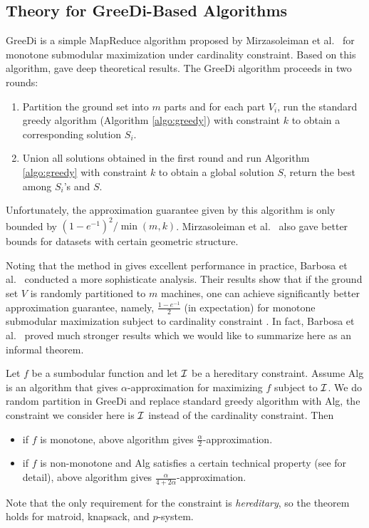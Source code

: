 \subsection{Theory for {\sc GreeDi}-Based Algorithms}
{\sc GreeDi} is a simple MapReduce algorithm proposed by  Mirzasoleiman et al.\ \cite{MKS+13} for monotone submodular maximization under cardinality constraint. Based on this algorithm, \cite{DEN+15,MZ15} gave deep theoretical results. The {\sc GreeDi} algorithm proceeds in two rounds:
\begin{enumerate}
\item Partition the ground set into $m$ parts and for each part $V_i$, run the standard greedy algorithm (Algorithm \ref{algo:greedy}) with constraint $k$ to obtain a corresponding solution $S_i$.
\item Union all solutions obtained in the first round and run Algorithm \ref{algo:greedy} with constraint $k$ to obtain a global solution $S$, return the best among $S_i$'s and $S$.
\end{enumerate}

Unfortunately, the approximation guarantee given by this algorithm is only bounded by $(1 - e^{-1})^2/\min(m, k)$. Mirzasoleiman et al.\ \cite{MKS+13} also gave better bounds for datasets with certain geometric structure.

Noting that the method in \cite{MKS+13} gives excellent performance in practice, Barbosa et al.\ \cite{DEN+15} conducted a more sophisticate analysis. Their results show that if the ground set $V$ is randomly partitioned to $m$ machines, one can achieve significantly better approximation guarantee, namely, $\frac{1 - e^{-1}}{2}$ (in expectation) for monotone submodular maximization subject to cardinality constraint . In fact, Barbosa et al.\ \cite{DEN+15} proved much stronger results which we would like to summarize here as an informal theorem.
\begin{theorem}
  \label{thm:randomGreeDi}
  Let $f$ be a sumbodular function and let $\mathcal{I}$ be a hereditary constraint. Assume {\sc Alg} is an algorithm that gives $\alpha$-approximation for maximizing $f$ subject to $\mathcal{I}$. We do random partition in {\sc GreeDi} and replace standard greedy algorithm with {\sc Alg}, the constraint we consider here is $\mathcal{I}$ instead of the cardinality constraint. Then 
  \begin{itemize}
  \item if $f$ is monotone, above algorithm gives $\frac{\alpha}{2}$-approximation.
  \item if $f$ is non-monotone and {\sc Alg} satisfies a certain technical property (see \cite{DEN+15} for detail), above algorithm gives $\frac{\alpha}{4 + 2\alpha}$-approximation.
  \end{itemize}
\end{theorem}
Note that the only requirement for the constraint is \emph{hereditary}, so the theorem holds for matroid, knapsack, and $p$-system.
 


